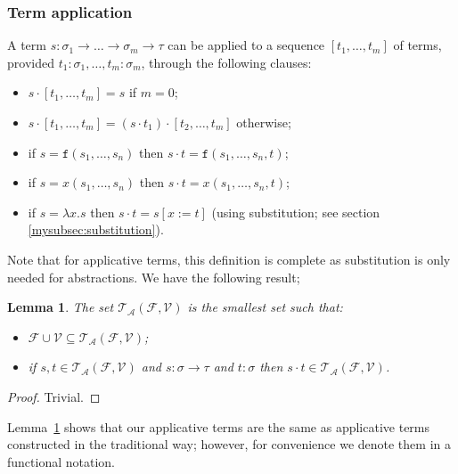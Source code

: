 \documentclass{lmcs}
\theoremstyle{theorem}\newtheorem{theorem}[dummy]{Theorem}
\theoremstyle{theorem}\newtheorem{lemma}[dummy]{Lemma}
\theoremstyle{theorem}\newtheorem{corollary}[dummy]{Corollary}
\theoremstyle{definition}\newtheorem{definition}[dummy]{Definition}
\theoremstyle{definition}\newtheorem{example}[dummy]{Example}
\newcommand{\F}{\mathcal{F}}
\newcommand{\V}{\mathcal{V}}
\newcommand{\ATerms}{\mathcal{T}_{\mathcal{A}}}
\newcommand{\atype}{\sigma}
\newcommand{\btype}{\tau}
\newcommand{\identifier}[1]{\mathtt{#1}}
\newcommand{\afun}{\identifier{f}}
\newcommand{\avar}{x}
\newcommand{\abs}[2]{\lambda #1.#2}
\newcommand{\arrtype}{\rightarrow}
\newcommand{\mysubsection}[1]{\vspace{-12pt}\subsubsection{#1}}
\begin{document}
\mysubsection{Term application}\label{mysubsec:application}
A term $s : \atype_1 \arrtype \dots \arrtype \atype_m \arrtype \btype$ can be applied to a sequence
$[t_1,\dots,t_m]$ of terms, provided $t_1 : \atype_1,\dots,t_m : \atype_m$, through the following
clauses:
\begin{itemize}
\item $s \cdot [t_1,\dots,t_m] = s$ if $m = 0$;
\item $s \cdot [t_1,\dots,t_m] = (s \cdot t_1) \cdot [t_2,\dots,t_m]$ otherwise;
\item if $s = \afun(s_1,\dots,s_n)$ then $s \cdot t = \afun(s_1,\dots,s_n,t)$;
\item if $s = \avar(s_1,\dots,s_n)$ then $s \cdot t = \avar(s_1,\dots,s_n,t)$;
\item if $s = \abs{\avar}{s}$ then $s \cdot t = s[\avar:=t]$ (using substitution;
  see section \ref{mysubsec:substitution}).
\end{itemize}

\bigskip
Note that for applicative terms, this definition is complete as substitution is only needed for
abstractions.  We have the following result;

\begin{lemma}\label{lem:applicative_notation}
The set $\ATerms(\F,\V)$ is the smallest set such that:
\begin{itemize}
\item $\F \cup \V \subseteq \ATerms(\F,\V)$;
\item if $s,t \in \ATerms(\F,\V)$ and $s : \atype \arrtype \btype$ and $t : \atype$ then
  $s \cdot t \in \ATerms(\F,\V)$.
\end{itemize}
\end{lemma}

\begin{proof}
Trivial.
\end{proof}

Lemma~\ref{lem:applicative_notation} shows that our applicative terms are the same as applicative
terms constructed in the traditional way; however, for convenience we denote them in a functional
notation.
\end{document}
